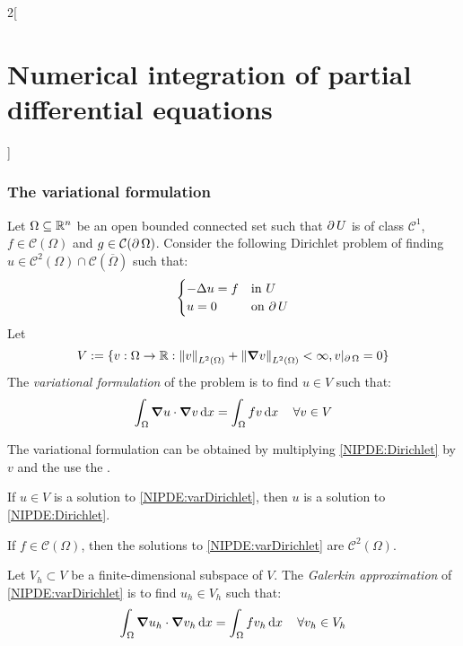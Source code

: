 \documentclass[../../../main_math.tex]{subfiles}
\begin{document}
\begin{multicols}{2}[\section{Numerical integration of partial differential equations}]
  \subsubsection{The variational formulation}
  \begin{definition}
    Let $\Omega\subseteq \mathbb{R}^n$ be an open bounded connected set such that $\operatorname{\partial}{U}$ is of class $\mathcal{C}^1$, $f\in\mathcal{C}(\Omega)$ and $g\in\mathcal{C}(\operatorname{\partial}{\Omega})$. Consider the following Dirichlet problem of finding $u\in\mathcal{C}^2(\Omega)\cap \mathcal{C}(\overline{\Omega})$ such that:
    \begin{equation}\label{NIPDE:Dirichlet}
      \begin{cases}
        -\Delta{u} = f & \text{in $U$}      \\
        u=0                & \text{on $\operatorname{\partial}{U}$}
      \end{cases}
    \end{equation}
    Let
    $$V:=\{v:\Omega\rightarrow\mathbb{R}:\left\|v\right\|_{L^2(\Omega)}+\left\|\grad{v}\right\|_{L^2(\Omega)}<\infty, v|_{\operatorname{\partial}{\Omega}}=0\}$$
    The \emph{variational formulation} of the problem is to find $u\in V$ such that:
    \begin{equation}\label{NIPDE:varDirichlet}
      \int_\Omega \grad{u}\cdot\grad{v}\dd{x}=\int_\Omega fv\dd{x}\quad\forall v\in V
    \end{equation}
  \end{definition}
  \begin{remark}
    The variational formulation can be obtained by multiplying \cref{NIPDE:Dirichlet} by $v$ and the use the .
  \end{remark}
  \begin{lemma}
    If $u\in V$ is a solution to \cref{NIPDE:varDirichlet}, then $u$ is a solution to \cref{NIPDE:Dirichlet}.
  \end{lemma}
  \begin{theorem}
    If $f\in \mathcal{C}(\Omega)$, then the solutions to \cref{NIPDE:varDirichlet} are $\mathcal{C}^2(\Omega)$.
  \end{theorem}
  \begin{definition}
    Let $V_h\subset V$ be a finite-dimensional subspace of $V$. The \emph{Galerkin approximation} of \cref{NIPDE:varDirichlet} is to find $u_h\in V_h$ such that:
    \begin{equation}\label{NIPDE:Galerkin}
      \int_\Omega \grad{u_h}\cdot\grad{v_h}\dd{x}=\int_\Omega fv_h\dd{x}\quad\forall v_h\in V_h
    \end{equation}
  \end{definition}

\end{multicols}
\end{document}
